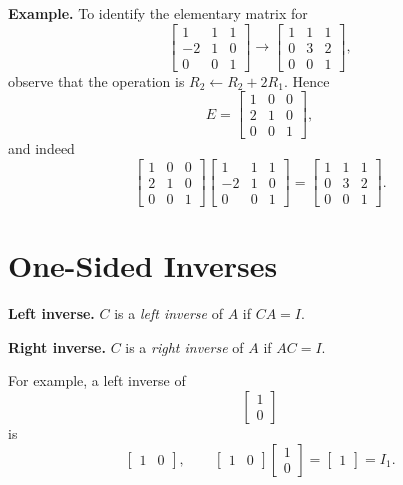\documentclass[11pt]{article}
\begin{document}
\textbf{Example.}  To identify the elementary matrix for
\[
\begin{bmatrix}1&1&1\\-2&1&0\\0&0&1\end{bmatrix}
\longrightarrow
\begin{bmatrix}1&1&1\\0&3&2\\0&0&1\end{bmatrix},
\]
observe that the operation is $R_2\leftarrow R_2+2R_1$.  Hence
\[
E=\begin{bmatrix}1&0&0\\2&1&0\\0&0&1\end{bmatrix},
\]
and indeed
\[
\begin{bmatrix}1&0&0\\2&1&0\\0&0&1\end{bmatrix}
\begin{bmatrix}1&1&1\\-2&1&0\\0&0&1\end{bmatrix}
=\begin{bmatrix}1&1&1\\0&3&2\\0&0&1\end{bmatrix}.
\]

\clearpage
\section{One-Sided Inverses}

\textbf{Left inverse.}  $C$ is a \emph{left inverse} of $A$ if $CA=I$.

\textbf{Right inverse.}  $C$ is a \emph{right inverse} of $A$ if $AC=I$.

For example, a left inverse of
\[
\begin{bmatrix}1\\0\end{bmatrix}
\]
is
\[
\begin{bmatrix}1&0\end{bmatrix},
\qquad
\begin{bmatrix}1&0\end{bmatrix}
\begin{bmatrix}1\\0\end{bmatrix}
=\begin{bmatrix}1\end{bmatrix}=I_1.
\]
\end{document}
